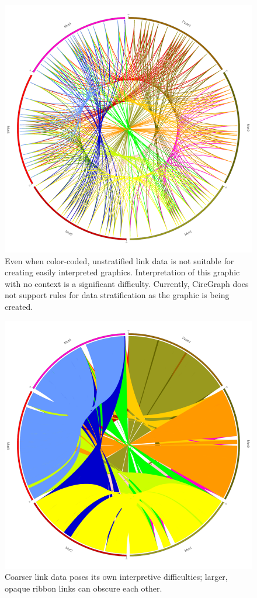 \documentclass[twocolumn]{article}
\newcommand{\projectName}{CircGraph\xspace}
\begin{document}
\begin{figure}
\centering
\includegraphics[scale=0.3]{./images/thumbs/Generated_Data_Non_Ribbon.png}
\caption{Even when color-coded, unstratified link data is not suitable for creating easily interpreted graphics. Interpretation of this graphic with no context is a significant difficulty. Currently, \projectName does not support rules for data stratification as the graphic is being created.\label{fig:nonribbon}}
\end{figure}

\begin{figure}
\centering
\includegraphics[scale=0.4]{./images/thumbs/Generated_Color_Fixes.png}
\caption{Coarser link data poses its own interpretive difficulties; larger, opaque ribbon links can obscure each other.\label{fig:colorfixes}}
\end{figure}
\end{document}
